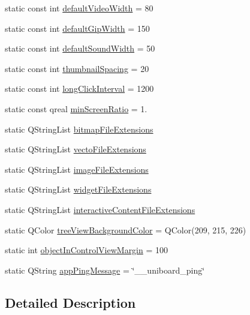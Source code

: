 \begin{DoxyCompactItemize}
static const int \hyperlink{class_u_b_settings_a29a27d9d1f0039e45cee7e0699cb9bdd}{default\-Video\-Width} = 80
\item 
static const int \hyperlink{class_u_b_settings_a1d48ed74e578e328b7299fea054fa5f5}{default\-Gip\-Width} = 150
\item 
static const int \hyperlink{class_u_b_settings_a830e97d1582930a84bf96845f6b7a141}{default\-Sound\-Width} = 50
\item 
static const int \hyperlink{class_u_b_settings_a75827aa0b1ea15cbfa77e1d4b2bf5ba3}{thumbnail\-Spacing} = 20
\item 
static const int \hyperlink{class_u_b_settings_a0549e150ac04cce8f3dc444a435a003b}{long\-Click\-Interval} = 1200
\item 
static const qreal \hyperlink{class_u_b_settings_ab2bdac6ad6c19dfbe7a5ded5d5c6b5a0}{min\-Screen\-Ratio} = 1.
\item 
static Q\-String\-List \hyperlink{class_u_b_settings_a3bb19bc8a412a4ec2fbf693a28aba52d}{bitmap\-File\-Extensions}
\item 
static Q\-String\-List \hyperlink{class_u_b_settings_a50ffb20fab9f7e6d499f0191cadf6f79}{vecto\-File\-Extensions}
\item 
static Q\-String\-List \hyperlink{class_u_b_settings_aafb3902650405393aa5b1fee66a59159}{image\-File\-Extensions}
\item 
static Q\-String\-List \hyperlink{class_u_b_settings_a6b53dbd3edf2ae46368eb7d1545f6e73}{widget\-File\-Extensions}
\item 
static Q\-String\-List \hyperlink{class_u_b_settings_ac280e585edabc97aa1c8fc815db8a488}{interactive\-Content\-File\-Extensions}
\item 
static Q\-Color \hyperlink{class_u_b_settings_ac66b5261e771dc368fb2e457d3d988e5}{tree\-View\-Background\-Color} = Q\-Color(209, 215, 226)
\item 
static int \hyperlink{class_u_b_settings_ada32d4a2077f1b7993992d994e407ead}{object\-In\-Control\-View\-Margin} = 100
\item 
static Q\-String \hyperlink{class_u_b_settings_ad837e5831a56b12281b11e84c0ddd61c}{app\-Ping\-Message} = \char`\"{}\-\_\-\-\_\-uniboard\-\_\-ping\char`\"{}
\end{DoxyCompactItemize}


\subsection{Detailed Description}


